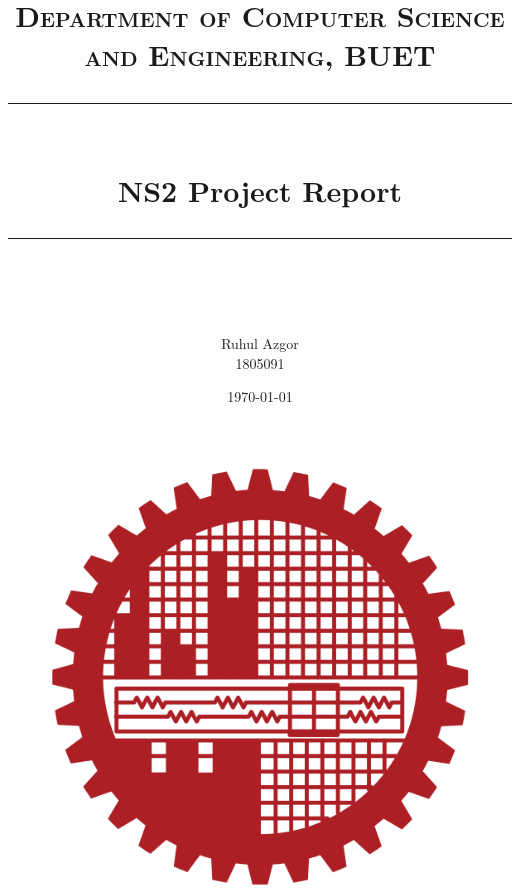\documentclass[14pt]{scrartcl} %
\title{	
	\normalfont\normalsize
	\textsc{Department of Computer Science and Engineering, BUET}\\ %
	\vspace{25pt} %
	\rule{\linewidth}{0.5pt}\\ %
	\vspace{20pt} %
	{\huge NS2 Project Report}\\ %
	\vspace{12pt} %
	\rule{\linewidth}{2pt}\\ %
	\vspace{12pt} %
}
\author{\LARGE Ruhul Azgor \\ 1805091} %
\date{\normalsize\today} %
\begin{document}
\maketitle %


\section*{}

\begin{figure}[h] %
	\centering
	\includegraphics[width=0.5\columnwidth]{Figures/BUET_LOGO.svg.png} %
	 
\end{figure}

\pagebreak

%

%


\end{document}
